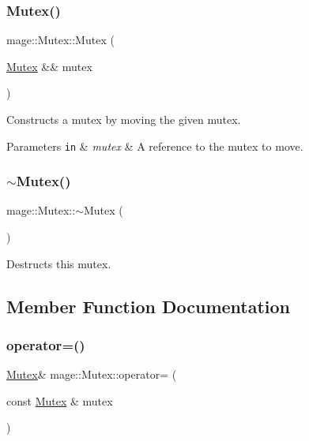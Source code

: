 \subsubsection{\texorpdfstring{Mutex()}{Mutex()}\hspace{0.1cm}{\footnotesize\ttfamily [3/3]}}
{\footnotesize\ttfamily mage\+::\+Mutex\+::\+Mutex (\begin{DoxyParamCaption}\item[{\hyperlink{structmage_1_1_mutex}{Mutex} \&\&}]{mutex }\end{DoxyParamCaption})\hspace{0.3cm}{\ttfamily [delete]}}

Constructs a mutex by moving the given mutex.


\begin{DoxyParams}[1]{Parameters}
\mbox{\tt in}  & {\em mutex} & A reference to the mutex to move. \\
\hline
\end{DoxyParams}
\hypertarget{structmage_1_1_mutex_a143d82ec7bb43f953a1703caa7972e9d}{}\label{structmage_1_1_mutex_a143d82ec7bb43f953a1703caa7972e9d} 
\subsubsection{\texorpdfstring{$\sim$\+Mutex()}{~Mutex()}}
{\footnotesize\ttfamily mage\+::\+Mutex\+::$\sim$\+Mutex (\begin{DoxyParamCaption}{ }\end{DoxyParamCaption})}

Destructs this mutex. 

\subsection{Member Function Documentation}
\hypertarget{structmage_1_1_mutex_a56072bdabdeadd5d897de232dbd298a0}{}\label{structmage_1_1_mutex_a56072bdabdeadd5d897de232dbd298a0} 
\subsubsection{\texorpdfstring{operator=()}{operator=()}\hspace{0.1cm}{\footnotesize\ttfamily [1/2]}}
{\footnotesize\ttfamily \hyperlink{structmage_1_1_mutex}{Mutex}\& mage\+::\+Mutex\+::operator= (\begin{DoxyParamCaption}\item[{const \hyperlink{structmage_1_1_mutex}{Mutex} \&}]{mutex }\end{DoxyParamCaption})\hspace{0.3cm}{\ttfamily [delete]}}

